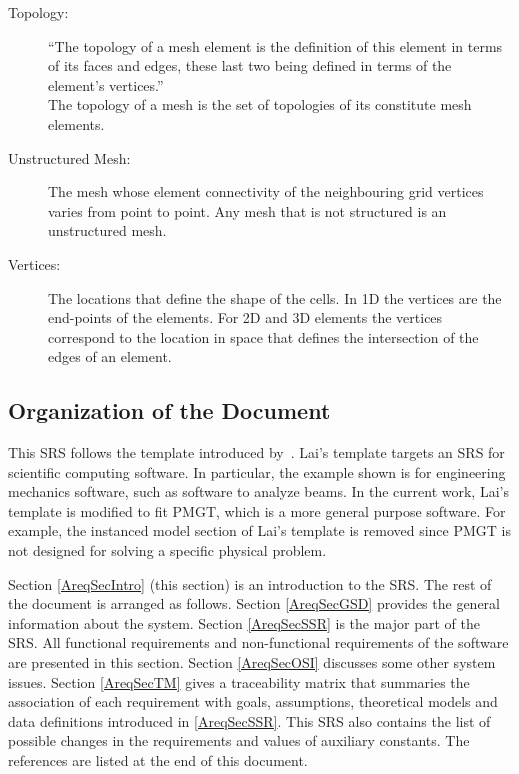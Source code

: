 \documentclass[12pt,titlepage]{article}
\begin{document}
\begin{description}
\item [Topology:] ``The topology of a mesh element is the definition of this element in terms of its faces and edges,
these last two being defined in terms of the element's vertices.''~\citep{FreyAndGeorge2000}\\
The topology of a mesh is the set of topologies of its constitute mesh elements.

\item [Unstructured Mesh:] The mesh whose element connectivity of the neighbouring grid vertices varies from point to
point.  Any mesh that is not structured is an unstructured mesh. \citep{Smith2004}

\item [Vertices:] The locations that define the shape of the cells.  In 1D the vertices are the end-points of the
elements.  For 2D and 3D elements the vertices correspond to the location in space that defines the intersection of
the edges of an element. \citep{Smith2004}

\end{description}


\subsection{Organization of the Document}
This SRS follows the template introduced by~\cite{Lai2004}. Lai's template targets an SRS for scientific computing software. In particular, the example shown is for engineering mechanics software, such as software to analyze beams. In the current work, Lai's template is modified to fit PMGT, which is a more general purpose software. For example, the instanced model section of Lai's template is removed since PMGT is not designed for solving a specific physical problem.
 
Section \ref{AreqSecIntro} (this section) is an introduction to the SRS. 
The rest of the document is arranged as follows. Section \ref{AreqSecGSD} provides the general information about the system. Section \ref{AreqSecSSR} is the major part of the SRS. All functional requirements and non-functional requirements of the software are presented in this section. Section \ref{AreqSecOSI} discusses some other system issues. Section \ref{AreqSecTM} gives a traceability matrix that summaries the association of each requirement with goals, assumptions, theoretical models and data definitions introduced in \ref{AreqSecSSR}. This SRS also contains the list of possible changes in the requirements and values of auxiliary constants. The references are listed at the end of this document.  
\end{document}
